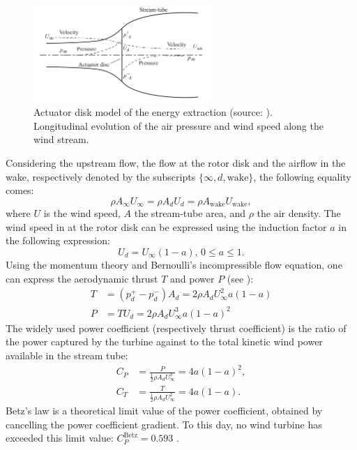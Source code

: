 \begin{figure}[!h]
    \centering
    \includegraphics[width=0.6\textwidth]{./part1/figures/actuator_disk.png}
    \caption{Actuator disk model of the energy extraction (source: \citealt{burton_2021_wind_handbook}). Longitudinal evolution of the air pressure and wind speed along the wind stream.}
    \label{fig:actuator_disk}
\end{figure}
Considering the upstream flow, the flow at the rotor disk and the airflow in the wake, respectively denoted by the subscripts $\{\infty, d, \mathrm{wake}\}$, the following equality comes:  
\begin{equation}
    \rho A_\infty U_\infty = \rho A_d U_d = \rho A_{\mathrm{wake}} U_{\mathrm{wake}},
\end{equation}
where $U$ is the wind speed, $A$ the stream-tube area, and $\rho$ the air density. 
The wind speed in at the rotor disk can be expressed using the induction factor $a$ in the following expression: 
\begin{equation}
    U_d = U_\infty (1 - a), \, 0\leq a \leq 1.
\end{equation}
Using the momentum theory and Bernoulli's incompressible flow equation, one can express the aerodynamic thrust $T$ and power $P$ (see \citealt{milano_thesis_2021}): 
\begin{subequations}
    \begin{align}
        T&=(p_d^+ - p_d^-) A_d = 2 \rho A_d U_\infty^2 a (1- a)\\
        P&= T U_d = 2 \rho A_d U_\infty^3 a (1- a)^2
    \end{align}
    \label{eq:momentum_theory}
\end{subequations}
The widely used power coefficient (respectively thrust coefficient) is the ratio of the power captured by the turbine against to the total kinetic wind power available in the stream tube: 
\begin{subequations}
    \begin{align}
        C_P &= \frac{P}{\frac12 \rho A_d U_\infty^3} = 4a (1-a)^2,\\
        C_T &= \frac{T}{\frac12 \rho A_d U_\infty^2} = 4a (1-a). 
    \end{align}
\end{subequations} 
Betz's law is a theoretical limit value of the power coefficient, obtained by cancelling the power coefficient gradient. 
To this day, no wind turbine has exceeded this limit value: $C_P^{\mathrm{Betz}} = 0.593$ \citep{burton_2021_wind_handbook}.  



